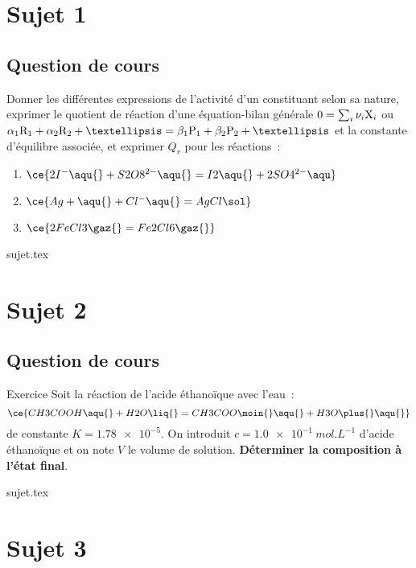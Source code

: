 \documentclass[a4paper, 11pt]{book}
\begin{document}
\chapter{Sujet 1}
\section{Question de cours}

Donner les différentes expressions de l'activité d'un constituant selon sa
nature, exprimer le quotient de réaction d'une équation-bilan générale $0=\sum_i
\nu_i{\rm X}_i$ ou $\alpha_1{\rm R}_1 + \alpha_2{\rm R}_2 + … = \beta_1{\rm P}_1
+ \beta_2{\rm P}_2 + …$ et la constante d'équilibre associée, et exprimer $Q_r$
pour les réactions~:
\begin{enumerate}
    \item $\ce{2I^-\aqu{} + S2O8^{2-}\aqu{} = I2\aqu{} +2SO4^{2-}\aqu}$
    \item $\ce{Ag+\aqu{} + Cl^-\aqu{} = AgCl\sol}$
    \item $\ce{2FeCl3\gaz{} = Fe2Cl6\gaz{}}$
\end{enumerate}

\resetQ
{sujet.tex}

\newpage

\chapter{Sujet 2}
\section{Question de cours}
\begin{NCexem}[width=\linewidth, breakable]{Exercice}
    Soit la réaction de l'acide éthanoïque avec l'eau~:
    \[\ce{CH3COOH\aqu{} + H2O\liq{} = CH3COO\moin{}\aqu{} + H3O\plus{}\aqu{}}\]
    de constante $K = \num{1.78e-5}$. On introduit $c = \SI{1.0e-1}{mol.L^{-1}}$
    d'acide éthanoïque et on note $V$ le volume de solution. \textbf{Déterminer
    la composition à l'état final}.
\end{NCexem}

\resetQ
{sujet.tex}

\newpage

\chapter{Sujet 3}
\end{document}
